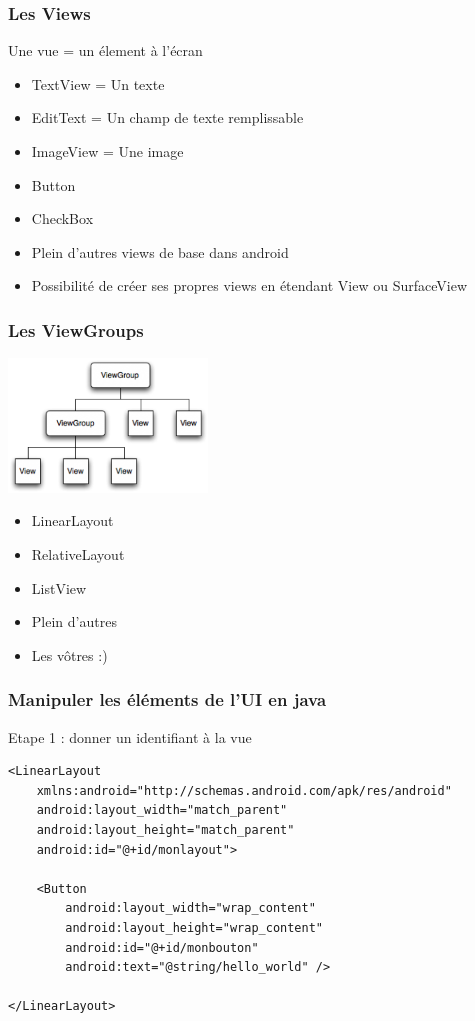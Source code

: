 \documentclass{beamer}
\begin{document}
\begin{frame}[fragile]
\frametitle{Les Views}
   Une vue = un élement à l'écran
  \begin{itemize}
    \item TextView = Un texte
    \item EditText = Un champ de texte remplissable
    \item ImageView = Une image
    \item Button
    \item CheckBox
    \item Plein d'autres views de base dans android
    \item Possibilité de créer ses propres views en étendant View ou SurfaceView
 \end{itemize}
\end{frame}
\begin{frame}[fragile]
\frametitle{Les ViewGroups}
  \includegraphics[width=150pt]{viewgroup.png}
  \begin{itemize}
 \item LinearLayout
 \item RelativeLayout
 \item ListView
 \item Plein d'autres
 \item Les vôtres :)
 \end{itemize}
\end{frame}
\begin{frame}[fragile]
\frametitle{Manipuler les éléments de l'UI en java}
Etape 1 : donner un identifiant à la vue
\begin{lstlisting}
<LinearLayout 
	xmlns:android="http://schemas.android.com/apk/res/android"
    android:layout_width="match_parent"
    android:layout_height="match_parent"
    android:id="@+id/monlayout">

    <Button
        android:layout_width="wrap_content"
        android:layout_height="wrap_content"
        android:id="@+id/monbouton"
        android:text="@string/hello_world" />

</LinearLayout>
\end{lstlisting}
\end{frame}
\end{document}
